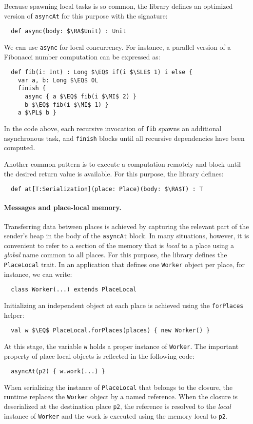 Because spawning local tasks is so common, the library defines an optimized version of
\lstinline{asyncAt} for this purpose with the signature:
\begin{lstlisting}
  def async(body: $\RA$Unit) : Unit
\end{lstlisting}
We can use \lstinline{async} for local concurrency. For instance, a parallel
version of a Fibonacci number computation can be expressed as:
\begin{lstlisting}
  def fib(i: Int) : Long $\EQ$ if(i $\SLE$ 1) i else {
    var a, b: Long $\EQ$ 0L
    finish {
      async { a $\EQ$ fib(i $\MI$ 2) }
      b $\EQ$ fib(i $\MI$ 1) }
    a $\PL$ b }
\end{lstlisting}
In the code above, each recursive invocation of \lstinline{fib} spawns an
additional asynchronous task, and \lstinline{finish} blocks until all
recursive dependencies have been computed.

Another common pattern is to execute a computation remotely and block until the
desired return value is available. For this purpose, the library defines:
\begin{lstlisting}
  def at[T:Serialization](place: Place)(body: $\RA$T) : T
\end{lstlisting}

\paragraph{Messages and place-local memory.}
Transferring data between places is achieved by capturing the relevant part of
the sender's heap in the body of the \lstinline{asyncAt} block. In many
situations, however, it is convenient to refer to a section of the memory that
is \emph{local} to a place using a \emph{global} name common to all places. For this
purpose, the library defines the \lstinline{PlaceLocal} trait. In an
application that defines one \lstinline{Worker} object per place, for instance,
we can write:
\begin{lstlisting}
  class Worker(...) extends PlaceLocal
\end{lstlisting}
Initializing an independent object at each place is achieved using the
\lstinline{forPlaces} helper:
\begin{lstlisting}
  val w $\EQ$ PlaceLocal.forPlaces(places) { new Worker() }
\end{lstlisting}
At this stage, the variable \lstinline{w} holds a proper instance of
\lstinline{Worker}. The important property of place-local objects is reflected
in the following code:
\begin{lstlisting}
  asyncAt(p2) { w.work(...) }
\end{lstlisting}
When serializing the instance of \lstinline{PlaceLocal} that belongs to the
closure, the runtime replaces the \lstinline{Worker} object by a named
reference. When the closure is deserialized at the destination place
\lstinline{p2}, the reference is resolved to the \emph{local} instance of
\lstinline{Worker} and the work is executed using the memory local to
\lstinline{p2}.

